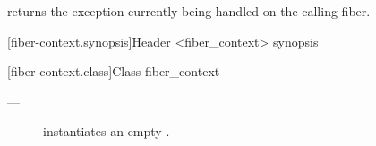  returns the exception currently being handled on the
calling fiber.



[fiber-context.synopsis]{Header <fiber\_context> synopsis}


[fiber-context.class]{Class fiber\_context}


\label{constructor}

\effects
\begin{description}
    \item[---] instantiates an empty \fiber.
\end{description}

